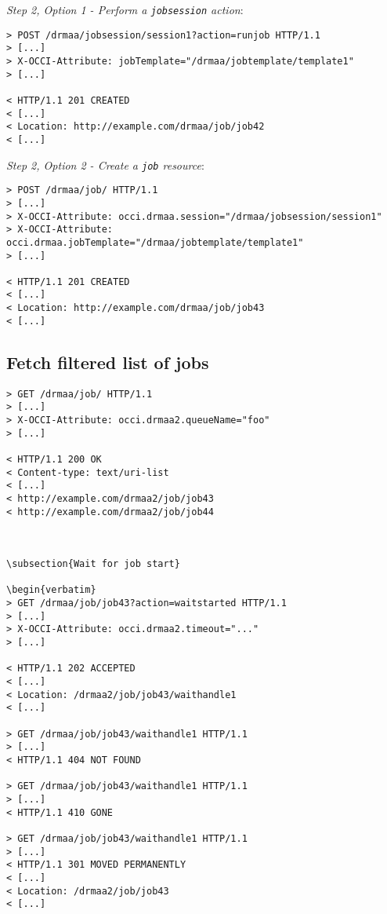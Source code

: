 \documentclass[10pt]{article}
\newcommand{\h}[1]{\lstinline|#1|}
\begin{document}

\emph{Step 2, Option 1 - Perform a \h{jobsession} action}:

\begin{verbatim}
> POST /drmaa/jobsession/session1?action=runjob HTTP/1.1
> [...]
> X-OCCI-Attribute: jobTemplate="/drmaa/jobtemplate/template1"
> [...]

< HTTP/1.1 201 CREATED 
< [...] 
< Location: http://example.com/drmaa/job/job42
< [...]
\end{verbatim}

\emph{Step 2, Option 2 - Create a \h{job} resource}:

\begin{verbatim}
> POST /drmaa/job/ HTTP/1.1
> [...]
> X-OCCI-Attribute: occi.drmaa.session="/drmaa/jobsession/session1"
> X-OCCI-Attribute: occi.drmaa.jobTemplate="/drmaa/jobtemplate/template1"
> [...]

< HTTP/1.1 201 CREATED 
< [...] 
< Location: http://example.com/drmaa/job/job43
< [...]
\end{verbatim}


\subsection{Fetch filtered list of jobs}

\begin{verbatim}
> GET /drmaa/job/ HTTP/1.1
> [...]
> X-OCCI-Attribute: occi.drmaa2.queueName="foo"
> [...]

< HTTP/1.1 200 OK 
< Content-type: text/uri-list
< [...]
< http://example.com/drmaa2/job/job43
< http://example.com/drmaa2/job/job44



\subsection{Wait for job start}

\begin{verbatim}
> GET /drmaa/job/job43?action=waitstarted HTTP/1.1
> [...] 
> X-OCCI-Attribute: occi.drmaa2.timeout="..."
> [...] 

< HTTP/1.1 202 ACCEPTED
< [...] 
< Location: /drmaa2/job/job43/waithandle1
< [...] 

> GET /drmaa/job/job43/waithandle1 HTTP/1.1
> [...] 
< HTTP/1.1 404 NOT FOUND

> GET /drmaa/job/job43/waithandle1 HTTP/1.1
> [...] 
< HTTP/1.1 410 GONE

> GET /drmaa/job/job43/waithandle1 HTTP/1.1
> [...] 
< HTTP/1.1 301 MOVED PERMANENTLY
< [...] 
< Location: /drmaa2/job/job43
< [...] 
\end{verbatim}
\end{document}
